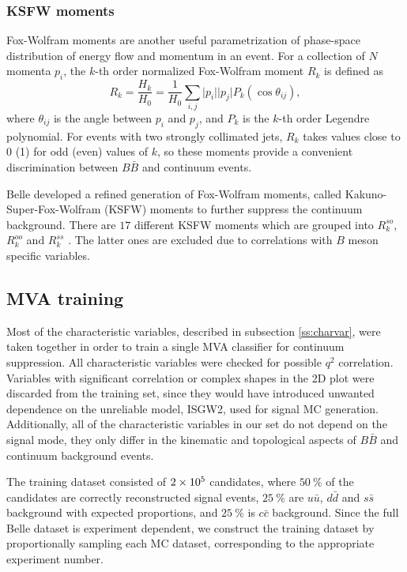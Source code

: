 \subsubsection{KSFW moments}
Fox-Wolfram moments are another useful parametrization of phase-space distribution of energy flow and momentum in an event. For a collection of $N$ momenta $p_i$, the $k$-th order normalized Fox-Wolfram moment $R_k$ is defined as
\begin{equation}
R_k = \frac{H_k}{H_0} = \frac{1}{H_0} \sum_{i,j} \vert p_i \vert \vert p_j \vert P_k(\cos \theta_{ij}),
\end{equation}
where $\theta_{ij}$ is the angle between $p_i$ and $p_j$, and $P_k$ is the $k$-th order Legendre polynomial. For events with two strongly collimated jets, $R_k$ takes values close to 0 (1) for odd (even) values of $k$, so these moments provide a convenient discrimination between $B \bar B$ and continuum events.

Belle developed a refined generation of Fox-Wolfram moments, called Kakuno-Super-Fox-Wolfram (KSFW) moments to further suppress the continuum background. There are $17$  different KSFW moments which are grouped into $R^{so}_k$, $R^{oo}_k$ and $R^{ss}_k$ \cite{bevan2014physics}. The latter ones are excluded due to correlations with $B$ meson specific variables.

\subsection{MVA training}
\label{ss:qqmva}
Most of the characteristic variables, described in subsection \ref{ss:charvar}, were taken together in order to train a single MVA classifier for continuum suppression. All characteristic variables were checked for possible $q^2$ correlation. Variables with significant correlation or complex shapes in the 2D plot were discarded from the training set, since they would have introduced unwanted dependence on the unreliable model, ISGW2, used for signal MC generation. Additionally, all of the characteristic variables in our set do not depend on the signal mode, they only differ in the kinematic and topological aspects of $B \bar B$ and continuum background events.

The training dataset consisted of $2\times 10^{5}$ candidates, where $50~\%$ of the candidates are correctly reconstructed signal events, $25~\%$ are $u \bar u$, $d \bar d$ and $s \bar s$ background with expected proportions, and $25~\%$ is $c \bar c$ background. Since the full Belle dataset is experiment dependent, we construct the training dataset by proportionally sampling each MC dataset, corresponding to the appropriate experiment number.

